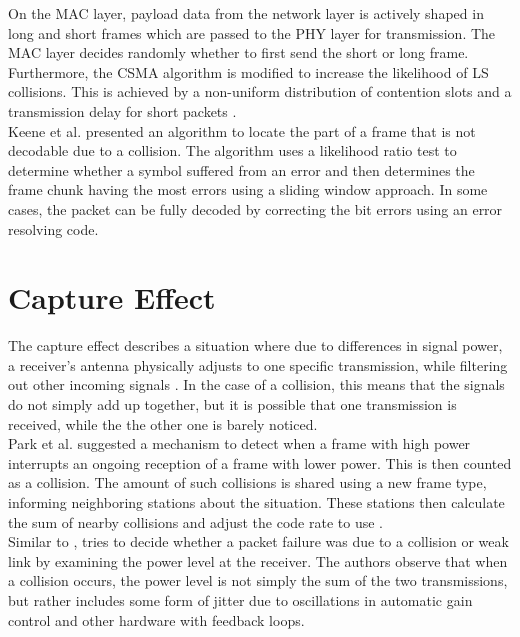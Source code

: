 On the MAC layer, payload data from the network layer is actively shaped in long and short frames which are passed to the PHY layer for transmission. The MAC layer decides randomly whether to first send the short or long frame. Furthermore, the \gls{CSMA} algorithm is modified to increase the likelihood of LS collisions. This is achieved by a non-uniform distribution of contention slots and a transmission delay for short packets \cite{wu2010}.\\

Keene et al. \cite{keene2010} presented an algorithm to locate the part of a frame that is not decodable due to a collision. The algorithm uses a likelihood ratio test to determine whether a symbol suffered from an error and then determines the frame chunk having the most errors using a sliding window approach. In some cases, the packet can be fully decoded by correcting the bit errors using an error resolving code.



\section{Capture Effect}\label{sec:related-capture}

The capture effect describes a situation where due to differences in signal power, a receiver's antenna physically adjusts to one specific transmission, while filtering out other incoming signals \cite{kim1999}. In the case of a collision, this means that the signals do not simply add up together, but it is possible that one transmission is received, while the the other one is barely noticed.\\

Park et al. suggested a mechanism to detect when a frame with high power interrupts an ongoing reception of a frame with lower power. This is then counted as a collision. The amount of such collisions is shared using a new frame type, informing neighboring stations about the situation. These stations then calculate the sum of nearby collisions and adjust the code rate to use \cite{park2009}.\\

Similar to \cite{zhu2016}, \cite{chua2016} tries to decide whether a packet failure was due to a collision or weak link by examining the power level at the receiver. The authors observe that when a collision occurs, the power level is not simply the sum of the two transmissions, but rather includes some form of jitter due to oscillations in automatic gain control and other hardware with feedback loops.\\

